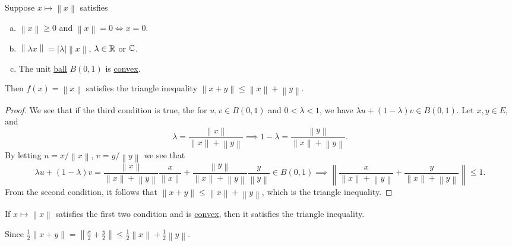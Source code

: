 \begin{lemma}\label{lma:trig-ineq-unit-ball-convex}
	Suppose \(x\mapsto \left\lVert x\right\rVert \) satisfies
	\begin{enumerate}[(a)]
		\item \(\left\lVert x\right\rVert \geq 0\) and \(\left\lVert x\right\rVert =0 \iff x=0\).
		\item \(\left\lVert \lambda x\right\rVert = \left\vert \lambda  \right\vert \left\lVert x\right\rVert\), \(\lambda \in\mathbb{\MakeUppercase{r}} \) or \(\mathbb{\MakeUppercase{c}} \).
		\item The unit \hyperref[def:ball]{ball} \(B(0, 1)\) is \hyperref[def:convex-set]{convex}.
	\end{enumerate}
	Then \(f(x) = \left\lVert x\right\rVert \) satisfies the triangle inequality \(\left\lVert x + y\right\rVert \leq \left\lVert x\right\rVert + \left\lVert y\right\rVert \).
\end{lemma}
\begin{proof}
	We see that if the third condition is true, the for \(u, v\in B(0, 1)\) and \(0<\lambda <1\), we have \(\lambda u + (1 - \lambda )v \in B(0, 1)\). Let \(x, y\in E\), and
	\[
		\lambda = \frac{\left\lVert x\right\rVert }{\left\lVert x\right\rVert + \left\lVert y\right\rVert }\implies 1 - \lambda = \frac{\left\lVert y\right\rVert }{\left\lVert x\right\rVert + \left\lVert y\right\rVert }.
	\]
	By letting \(u = x / \left\lVert x\right\rVert \), \(v = y / \left\lVert y\right\rVert \) we see that
	\[
		\lambda u + (1 - \lambda )v = \frac{\left\lVert x\right\rVert }{\left\lVert x\right\rVert + \left\lVert y\right\rVert } \frac{x}{\left\lVert x\right\rVert } + \frac{\left\lVert y\right\rVert }{\left\lVert x\right\rVert + \left\lVert y\right\rVert }\frac{y}{\left\lVert y\right\rVert }\in B(0, 1) \implies \left\lVert \frac{x}{\left\lVert x\right\rVert + \left\lVert y\right\rVert } + \frac{y}{\left\lVert x\right\rVert + \left\lVert y\right\rVert }\right\rVert \leq 1.
	\]
	From the second condition, it follows that \(\left\lVert x + y\right\rVert \leq \left\lVert x\right\rVert + \left\lVert y\right\rVert \), which is the triangle inequality.
\end{proof}

\begin{remark}
	If \(x\mapsto \left\lVert x\right\rVert \) satisfies the first two condition and is \hyperref[def:convex-function]{convex}, then it satisfies the triangle inequality.
\end{remark}
\begin{explanation}
	Since \(\frac{1}{2}\left\lVert x + y\right\rVert = \left\lVert \frac{x}{2} + \frac{y}{2}\right\rVert \leq \frac{1}{2}\left\lVert x\right\rVert + \frac{1}{2}\left\lVert y\right\rVert\).
\end{explanation}

